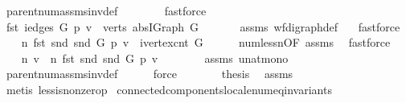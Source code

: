 \begin{isabellebody}
\ parent{\isacharunderscore}num{\isacharunderscore}assms{\isacharunderscore}inv{\isacharunderscore}def\ \ \isanewline
\ \ \ \ \isamarkupfalse%
\ fastforce\isanewline
\ \ \isamarkupfalse%
\ {\isachardoublequoteopen}fst\ {\isacharparenleft}iedges\ G\ {\isacharparenleft}p\ v{\isacharparenright}{\isacharparenright}\ {\isasymin}\ verts\ {\isacharparenleft}abs{\isacharunderscore}IGraph\ G{\isacharparenright}{\isachardoublequoteclose}\isanewline
\ \ \ \ \ \isamarkupfalse%
\ assms{\isacharparenleft}{}{\isacharparenright}\ wf{\isacharunderscore}digraph{\isacharunderscore}def\ \ \isamarkupfalse%
\ fastforce\isanewline
\ \ \isamarkupfalse%
\ {\isachardoublequoteopen}n\ {\isacharparenleft}fst\ {\isacharparenleft}snd\ {\isacharparenleft}snd\ G{\isacharparenright}\ {\isacharparenleft}p\ v{\isacharparenright}{\isacharparenright}{\isacharparenright}\ {\isacharless}\ ivertex{\isacharunderscore}cnt\ G{\isachardoublequoteclose}\isanewline
\ \ \ \ \isamarkupfalse%
\ num{\isacharunderscore}less{\isacharunderscore}n{\isacharbrackleft}OF\ assms{\isacharparenleft}{}{\isacharcomma}{}{\isacharparenright}{\isacharbrackright}\ \isamarkupfalse%
\ fastforce\isanewline
\ \ \isamarkupfalse%
\isanewline
\ \ \isamarkupfalse%
\ {\isachardoublequoteopen}n\ v\ {\isacharequal}\ n\ {\isacharparenleft}fst\ {\isacharparenleft}snd\ {\isacharparenleft}snd\ G{\isacharparenright}\ {\isacharparenleft}p\ v{\isacharparenright}{\isacharparenright}{\isacharparenright}\ {\isacharplus}\ {}{\isachardoublequoteclose}\isanewline
\ \ \ \ \isamarkupfalse%
\ assms\ unat{\isacharunderscore}mono\isanewline
\ \ \ \ \isamarkupfalse%
\ parent{\isacharunderscore}num{\isacharunderscore}assms{\isacharunderscore}inv{\isacharunderscore}def\isanewline
\ \ \ \ \isamarkupfalse%
\ force\ \isanewline
\ \ \isamarkupfalse%
\isanewline
\ \ \isamarkupfalse%
\ {\isacharquery}thesis\ \isamarkupfalse%
\ assms\ \ \isanewline
\ \ \isamarkupfalse%
\ {\isacharparenleft}metis\ less{\isacharunderscore}is{\isacharunderscore}non{\isacharunderscore}zero{\isacharunderscore}p{}{\isacharparenright}\isanewline
{}\isamarkupfalse%
%
\endisatagproof
{\isafoldproof}%
%
\isadelimproof
\isanewline
%
\endisadelimproof
\isanewline
{}\isamarkupfalse%
\ connected{\isacharunderscore}components{\isacharunderscore}locale{\isacharunderscore}num{\isacharunderscore}eq{\isacharunderscore}invariants{\isacharprime}{\isacharcolon}\isanewline

\end{isabellebody}
